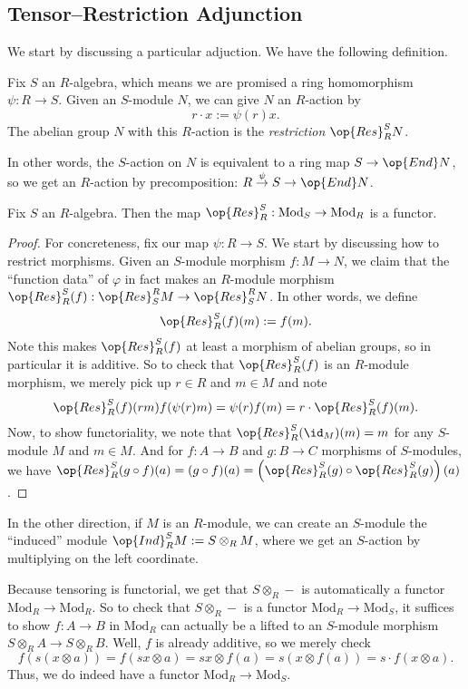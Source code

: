 \subsection{Tensor--Restriction Adjunction}
We start by discussing a particular adjuction. We have the following definition.
\begin{definition}[Restriction]
	Fix $S$ an $R$-algebra, which means we are promised a ring homomorphism $\psi:R\to S$. Given an $S$-module $N$, we can give $N$ an $R$-action by
	\[r\cdot x:=\psi(r)x.\]
	The abelian group $N$ with this $R$-action is the \textit{restriction} $\op{Res}_R^SN$.
\end{definition}
In other words, the $S$-action on $N$ is equivalent to a ring map $S\to\op{End}N$, so we get an $R$-action by precomposition: $R\stackrel\psi\to S\to\op{End}N$.
\begin{lemma}
	Fix $S$ an $R$-algebra. Then the map $\op{Res}^S_R:\textrm{Mod}_S\to\textrm{Mod}_R$ is a functor.
\end{lemma}
\begin{proof}
	For concreteness, fix our map $\psi:R\to S$. We start by discussing how to restrict morphisms. Given an $S$-module morphism $f:M\to N$, we claim that the ``function data'' of $\varphi$ in fact makes an $R$-module morphism $\op{Res}_R^S(f):\op{Res}_S^RM\to\op{Res}_S^RN$. In other words, we define
	\[\op{Res}_R^S(f)(m):=f(m).\]
	Note this makes $\op{Res}_R^S(f)$ at least a morphism of abelian groups, so in particular it is additive. So to check that $\op{Res}_R^S(f)$ is an $R$-module morphism, we merely pick up $r\in R$ and $m\in M$ and note
	\[\op{Res}_R^S(f)(rm)f(\psi(r)m)=\psi(r)f(m)=r\cdot\op{Res}_R^S(f)(m).\]
	Now, to show functoriality, we note that $\op{Res}_R^S(\id_M)(m)=m$ for any $S$-module $M$ and $m\in M$. And for $f:A\to B$ and $g:B\to C$ morphisms of $S$-modules, we have $\op{Res}_R^S(g\circ f)(a)=(g\circ f)(a)=\left(\op{Res}_R^S(g)\circ\op{Res}_R^S(g)\right)(a)$.
\end{proof}

In the other direction, if $M$ is an $R$-module, we can create an $S$-module the ``induced'' module $\op{Ind}_R^SM:=S\otimes_RM$, where we get an $S$-action by multiplying on the left coordinate.

Because tensoring is functorial, we get that $S\otimes_R-$ is automatically a functor $\textrm{Mod}_R\to\textrm{Mod}_R$. So to check that $S\otimes_R-$ is a functor $\textrm{Mod}_R\to\textrm{Mod}_S$, it suffices to show $f:A\to B$ in $\textrm{Mod}_R$ can actually be a lifted to an $S$-module morphism $S\otimes_RA\to S\otimes_RB$. Well, $f$ is already additive, so we merely check
\[f(s(x\otimes a))=f(sx\otimes a)=sx\otimes f(a)=s(x\otimes f(a))=s\cdot f(x\otimes a).\]
Thus, we do indeed have a functor $\textrm{Mod}_R\to\textrm{Mod}_S$.

